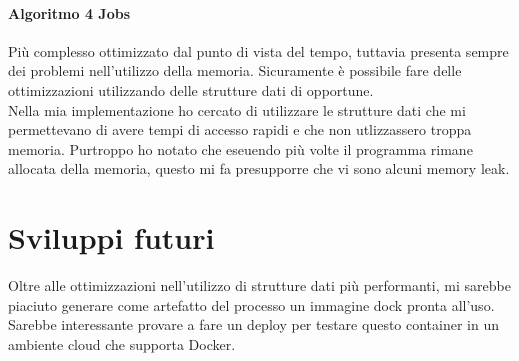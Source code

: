 \documentclass[paper=a4, fontsize=11pt]{scrartcl}	%
\numberwithin{equation}{section}															%
\numberwithin{figure}{section}																%
\numberwithin{table}{section}																%
\begin{document}
\paragraph{Algoritmo 4 Jobs}
Più complesso ottimizzato dal punto di vista del tempo, tuttavia presenta sempre dei problemi nell'utilizzo della memoria. Sicuramente è possibile fare delle ottimizzazioni utilizzando delle strutture dati di opportune.\\ 
Nella mia implementazione ho cercato di utilizzare le strutture dati che mi permettevano di avere tempi di accesso rapidi e che non utlizzassero troppa memoria. Purtroppo ho notato che eseuendo più volte il programma rimane allocata della memoria, questo mi fa presupporre che vi sono alcuni memory leak.\\

\section{Sviluppi futuri}
Oltre alle ottimizzazioni nell'utilizzo di strutture dati più performanti, mi sarebbe piaciuto generare come artefatto del processo un immagine dock pronta all'uso. Sarebbe interessante provare a fare un deploy per testare questo container in un ambiente cloud che supporta Docker.
\end{document}
